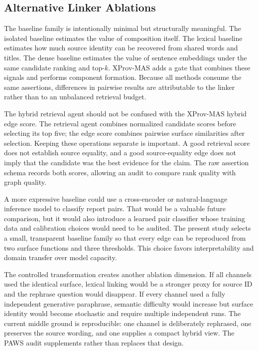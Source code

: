 \documentclass{ieeeaccess}
\begin{document}
\subsection{Alternative Linker Ablations}
The baseline family is intentionally minimal but structurally meaningful. The isolated baseline estimates the value of composition itself. The lexical baseline estimates how much source identity can be recovered from shared words and titles. The dense baseline estimates the value of sentence embeddings under the same candidate ranking and top-$k$. XProv-MAS adds a gate that combines these signals and performs component formation. Because all methods consume the same assertions, differences in pairwise results are attributable to the linker rather than to an unbalanced retrieval budget.

The hybrid retrieval agent should not be confused with the XProv-MAS hybrid edge score. The retrieval agent combines normalized candidate scores before selecting its top five; the edge score combines pairwise surface similarities after selection. Keeping these operations separate is important. A good retrieval score does not establish source equality, and a good source-equality edge does not imply that the candidate was the best evidence for the claim. The raw assertion schema records both scores, allowing an audit to compare rank quality with graph quality.

A more expressive baseline could use a cross-encoder or natural-language inference model to classify report pairs. That would be a valuable future comparison, but it would also introduce a learned pair classifier whose training data and calibration choices would need to be audited. The present study selects a small, transparent baseline family so that every edge can be reproduced from two surface functions and three thresholds. This choice favors interpretability and domain transfer over model capacity.

The controlled transformation creates another ablation dimension. If all channels used the identical surface, lexical linking would be a stronger proxy for source ID and the rephrase question would disappear. If every channel used a fully independent generative paraphrase, semantic difficulty would increase but surface identity would become stochastic and require multiple independent runs. The current middle ground is reproducible: one channel is deliberately rephrased, one preserves the source wording, and one supplies a compact hybrid view. The PAWS audit supplements rather than replaces that design.
\end{document}
